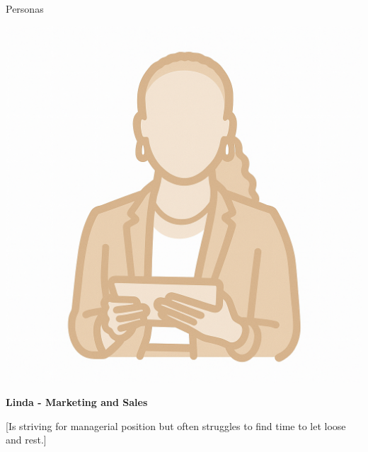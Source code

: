 \documentclass[final]{beamer}
\newlength{\colwidth}
\begin{document}
\begin{frame}[t]
\begin{columns}[t]
\begin{column}{\colwidth}
\begin{block}{Personas}
    \begin{minipage}[t]{0.3\linewidth}
      \centering
      \includegraphics[width=0.8\linewidth]{Linda.png}
    \end{minipage}
    \hfill
    \begin{minipage}[t]{0.65\linewidth}
      \textbf{Linda - Marketing and Sales}
      
      [Is striving for managerial position but often struggles to find time to let loose and rest.]
    \end{minipage}

  \end{block}


\end{column}
\end{columns}
\end{frame}
\end{document}

